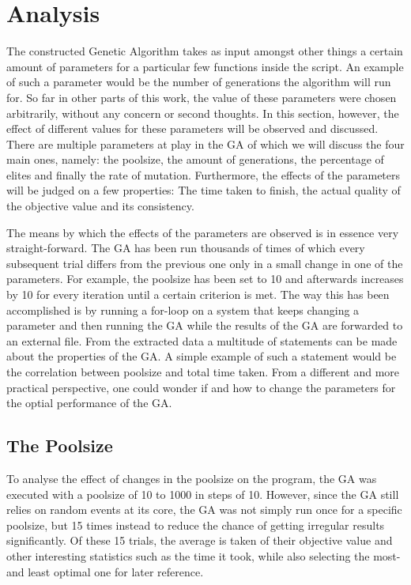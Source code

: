 \section{Analysis} \label{Analysis}

\par
The constructed Genetic Algorithm takes as input amongst other things a certain amount of parameters for a particular few functions inside the script. An example of such a parameter would be the number of generations the algorithm will run for. So far in other parts of this work, the value of these parameters were chosen arbitrarily, without any concern or second thoughts. In this section, however, the effect of different values for these parameters will be observed and discussed. 
There are multiple parameters at play in the GA of which we will discuss the four main ones, namely: the poolsize, the amount of generations, the percentage of elites and finally the rate of mutation. Furthermore, the effects of the parameters will be judged on a few properties: The time taken to finish, the actual quality of the objective value and its consistency.
\par
The means by which the effects of the parameters are observed is in essence very straight-forward. The GA has been run thousands of times of which every subsequent trial differs from the previous one only in a small change in one of the parameters.
For example, the poolsize has been set to 10 and afterwards increases by 10 for every iteration until a certain criterion is met. The way this has been accomplished is by running a for-loop on a system that keeps changing a parameter and then running the GA while the results of the GA are forwarded to an external file.
From the extracted data a multitude of statements can be made about the properties of the GA. A simple example of such a statement would be the correlation between poolsize and total time taken. From a different and more practical perspective, one could wonder if and how to change the parameters for the optial performance of the GA.


\subsection{The Poolsize}

\par
To analyse the effect of changes in the poolsize on the program, the GA was executed with a poolsize of 10 to 1000 in steps of 10. However, since the GA still relies on random events at its core, the GA was not simply run once for a specific poolsize, but 15 times instead to reduce the chance of getting irregular results significantly. Of these 15 trials, the average is taken of their objective value and other interesting statistics such as the time it took, while also selecting the most-and least optimal one for later reference.


